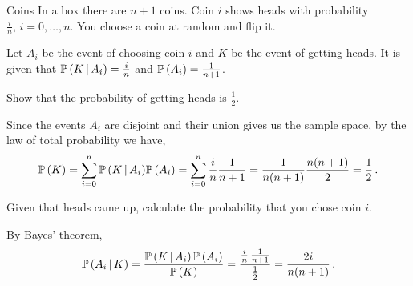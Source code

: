 \documentclass[10pt,english,solution]{exam-uoc}
\begin{document}
\thispagestyle{empty}




\begin{question}{Coins}
%
In a box there are $n+1$ coins.
Coin $i$ shows heads with probability $\frac{i}{n}, \, i=0,\ldots,n$.
You choose a coin at random and flip it. 

\begin{solution}
%
Let $A_i$ be the event of choosing coin $i$ and $K$ be the event of getting heads.
It is given that $\Prob(K \,|\, A_i)=\frac{i}{n}$ and $\Prob(A_i) = \frac{1}{n+1}$.
%
\end{solution}


\begin{subquestion}[10]
%
Show that the probability of getting heads is $\frac{1}{2}$.
%
\end{subquestion}

\begin{solution}
%
Since the events $A_i$ are disjoint and their union gives us the sample space, by the law
of total probability we have,
%
%
\begin{equation}
    \Prob(K) = \sum_{i=0}^n \Prob(K \,|\, A_i) \Prob(A_i) = 
    \sum_{i=0}^n \frac{i}{n} \frac{1}{n+1} =
    \frac{1}{n(n+1)} \frac{n(n+1)}{2} = \frac{1}{2} \,.
\end{equation}
%
%
\end{solution}

\begin{subquestion}[10]
%
Given that heads came up, calculate the probability that you chose coin $i$.
%
\end{subquestion}

\begin{solution}
%
By Bayes' theorem,
%
\begin{equation}
    \Prob( A_i \,|\, K) 
    =
    \frac{\Prob(K \,|\, A_i) \, \Prob( A_i ) }{\Prob( K )}
    =
    \frac{\frac{i}{n} \, \frac{1}{n+1}}{\frac{1}{2}}
    =
    \frac{2i}{n(n+1)} \,.
\end{equation}
%

%
\end{solution}

\end{question}
\end{document}
